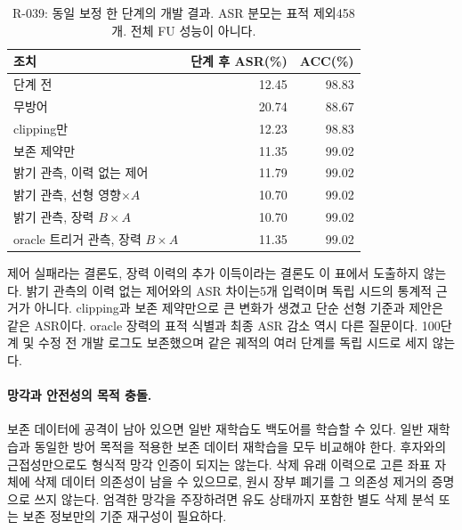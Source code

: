 \documentclass[10pt,a4paper]{article}
\begin{document}
\begin{table}[ht]\centering\small
\caption{R-039: 동일 보정 한 단계의 개발 결과. ASR 분모는 표적 제외458개. 전체 FU 성능이 아니다.}
\begin{tabular}{lrr}\toprule
조치 & 단계 후 ASR(\%) & ACC(\%)\\\midrule
단계 전 &12.45&98.83\\
무방어 &20.74&88.67\\
clipping만 &12.23&98.83\\
보존 제약만 &11.35&99.02\\
밝기 관측, 이력 없는 제어 &11.79&99.02\\
밝기 관측, 선형 영향$\times A$ &10.70&99.02\\
밝기 관측, 장력 $B\times A$ &10.70&99.02\\
oracle 트리거 관측, 장력 $B\times A$ &11.35&99.02\\\bottomrule
\end{tabular}
\end{table}
제어 실패라는 결론도, 장력 이력의 추가 이득이라는 결론도 이 표에서 도출하지 않는다.
밝기 관측의 이력 없는 제어와의 ASR 차이는5개 입력이며 독립 시드의 통계적 근거가 아니다.
clipping과 보존 제약만으로 큰 변화가 생겼고 단순 선형 기준과 제안은 같은 ASR이다.
oracle 장력의 표적 식별과 최종 ASR 감소 역시 다른 질문이다.
100단계 및 수정 전 개발 로그도 보존했으며 같은 궤적의 여러 단계를 독립 시드로 세지 않는다.

\paragraph{망각과 안전성의 목적 충돌.}
보존 데이터에 공격이 남아 있으면 일반 재학습도 백도어를 학습할 수 있다.
일반 재학습과 동일한 방어 목적을 적용한 보존 데이터 재학습을 모두 비교해야 한다.
후자와의 근접성만으로도 형식적 망각 인증이 되지는 않는다.
삭제 유래 이력으로 고른 좌표 자체에 삭제 데이터 의존성이 남을 수 있으므로,
원시 장부 폐기를 그 의존성 제거의 증명으로 쓰지 않는다.
엄격한 망각을 주장하려면 유도 상태까지 포함한 별도 삭제 분석 또는 보존 정보만의 기준 재구성이 필요하다.
\end{document}
